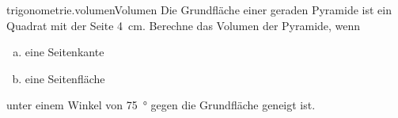 \begin{exercise}{trigonometrie.volumen}{Volumen}
  \ifproblem\problem
    Die Grundfläche einer geraden Pyramide ist ein Quadrat
    mit der Seite \SI{4}{\centi\metre}. Berechne das Volumen
    der Pyramide, wenn
    \begin{enumerate}[a)]
      \item eine Seitenkante
      \item eine Seitenfläche
    \end{enumerate}
    unter einem Winkel von \SI{75}{\degree} gegen die Grundfläche
    geneigt ist.
  \fi
\end{exercise}
